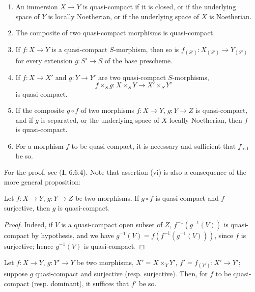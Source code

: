 \begin{proposition}[1.1.2]
\label{IV.1.1.2}
\begin{enumerate}
  \item[\textup{(i)}] An immersion $X\to Y$ is quasi-compact if it is closed, or if
  the underlying space of $Y$ is locally Noetherian, or if the underlying
  space of $X$ is Noetherian.
  \item[\textup{(ii)}] The composite of two quasi-compact morphisms is quasi-compact.
  \item[\textup{(iii)}] If $f:X\to Y$ is a quasi-compact $S$-morphism, then so is
  $f_{(S')}:X_{(S')}\to Y_{(S')}$ for every extension $g:S'\to S$ of the
  base prescheme.
  \item[\textup{(iv)}] If $f:X\to X'$ and $g:Y\to Y'$ are two quasi-compact
  $S$-morphisms,
  \[
    f\times_S g:X\times_S Y\to X'\times_S Y'
  \]
  is quasi-compact.
  \item[\textup{(v)}] If the composite $g\circ f$ of two morphisms $f:X\to Y$, $g:Y\to Z$
  is quasi-compact, and if $g$ is separated, or the underlying space of $X$
  locally Noetherian, then $f$ is quasi-compact.
  \item[\textup{(vi)}] For a morphism $f$ to be quasi-compact, it is necessary and
  sufficient that $f_{\mathrm{red}}$ be so.
\end{enumerate}
\end{proposition}

For the proof, see (\textbf{I}, 6.6.4). Note that assertion (vi) is
also a consequence of the more general proposition:

\begin{proposition}[1.1.3]
\label{IV.1.1.3}
Let $f:X\to Y$, $g:Y\to Z$ be two morphisms. If $g\circ f$ is
quasi-compact and $f$ surjective, then $g$ is quasi-compact.
\end{proposition}

\begin{proof}
Indeed, if $V$ is a quasi-compact open subset of $Z$,
$f^{-1}(g^{-1}(V))$ is quasi-compact by hypothesis, and we have
$g^{-1}(V)=f(f^{-1}(g^{-1}(V)))$, since $f$ is surjective; hence
$g^{-1}(V)$ is quasi-compact.
\end{proof}

\begin{corollary}[1.1.4]
\label{IV.1.1.4}
Let $f:X\to Y$, $g:Y'\to Y$ be two morphisms, $X'=X\times_Y Y'$,
$f'=f_{(Y')}:X'\to Y'$; suppose $g$ quasi-compact and surjective \textup{(resp.}
surjective\textup{)}. Then, for $f$ to be quasi-compact \textup{(resp.} dominant\textup{)}, it suffices
that $f'$ be so.
\end{corollary}

